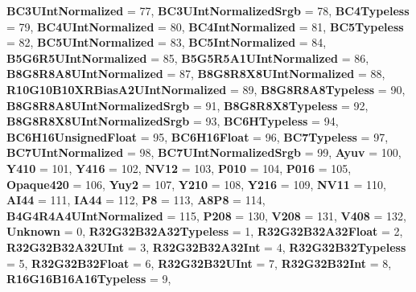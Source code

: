 \begin{DoxyCompactItemize}
{\bfseries B\+C3\+U\+Int\+Normalized} = 77, 
{\bfseries B\+C3\+U\+Int\+Normalized\+Srgb} = 78, 
{\bfseries B\+C4\+Typeless} = 79, 
{\bfseries B\+C4\+U\+Int\+Normalized} = 80, 
\newline
{\bfseries B\+C4\+Int\+Normalized} = 81, 
{\bfseries B\+C5\+Typeless} = 82, 
{\bfseries B\+C5\+U\+Int\+Normalized} = 83, 
{\bfseries B\+C5\+Int\+Normalized} = 84, 
\newline
{\bfseries B5\+G6\+R5\+U\+Int\+Normalized} = 85, 
{\bfseries B5\+G5\+R5\+A1\+U\+Int\+Normalized} = 86, 
{\bfseries B8\+G8\+R8\+A8\+U\+Int\+Normalized} = 87, 
{\bfseries B8\+G8\+R8\+X8\+U\+Int\+Normalized} = 88, 
\newline
{\bfseries R10\+G10\+B10\+X\+R\+Bias\+A2\+U\+Int\+Normalized} = 89, 
{\bfseries B8\+G8\+R8\+A8\+Typeless} = 90, 
{\bfseries B8\+G8\+R8\+A8\+U\+Int\+Normalized\+Srgb} = 91, 
{\bfseries B8\+G8\+R8\+X8\+Typeless} = 92, 
\newline
{\bfseries B8\+G8\+R8\+X8\+U\+Int\+Normalized\+Srgb} = 93, 
{\bfseries B\+C6\+H\+Typeless} = 94, 
{\bfseries B\+C6\+H16\+Unsigned\+Float} = 95, 
{\bfseries B\+C6\+H16\+Float} = 96, 
\newline
{\bfseries B\+C7\+Typeless} = 97, 
{\bfseries B\+C7\+U\+Int\+Normalized} = 98, 
{\bfseries B\+C7\+U\+Int\+Normalized\+Srgb} = 99, 
{\bfseries Ayuv} = 100, 
\newline
{\bfseries Y410} = 101, 
{\bfseries Y416} = 102, 
{\bfseries N\+V12} = 103, 
{\bfseries P010} = 104, 
\newline
{\bfseries P016} = 105, 
{\bfseries Opaque420} = 106, 
{\bfseries Yuy2} = 107, 
{\bfseries Y210} = 108, 
\newline
{\bfseries Y216} = 109, 
{\bfseries N\+V11} = 110, 
{\bfseries A\+I44} = 111, 
{\bfseries I\+A44} = 112, 
\newline
{\bfseries P8} = 113, 
{\bfseries A8\+P8} = 114, 
{\bfseries B4\+G4\+R4\+A4\+U\+Int\+Normalized} = 115, 
{\bfseries P208} = 130, 
\newline
{\bfseries V208} = 131, 
{\bfseries V408} = 132, 
{\bfseries Unknown} = 0, 
{\bfseries R32\+G32\+B32\+A32\+Typeless} = 1, 
\newline
{\bfseries R32\+G32\+B32\+A32\+Float} = 2, 
{\bfseries R32\+G32\+B32\+A32\+U\+Int} = 3, 
{\bfseries R32\+G32\+B32\+A32\+Int} = 4, 
{\bfseries R32\+G32\+B32\+Typeless} = 5, 
\newline
{\bfseries R32\+G32\+B32\+Float} = 6, 
{\bfseries R32\+G32\+B32\+U\+Int} = 7, 
{\bfseries R32\+G32\+B32\+Int} = 8, 
{\bfseries R16\+G16\+B16\+A16\+Typeless} = 9, 
\newline

\end{DoxyCompactItemize}
